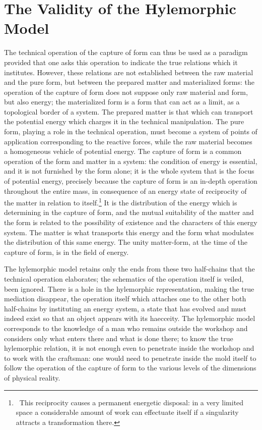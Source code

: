 \documentclass[a4paper]{article}
\begin{document}

\newpage
\section{The Validity of the Hylemorphic Model}

The technical operation of the capture of form can thus be used as a paradigm provided that one asks this operation to indicate the true relations which it institutes. However, these relations are not established between the raw material and the pure form, but between the prepared matter and materialized forms: the operation of the capture of form does not suppose only raw material and form, but also energy; the materialized form is a form that can act as a limit, as a topological border of a system. The prepared matter is that which can transport the potential energy which charges it in the technical manipulation. The pure form, playing a role in the technical operation, must become a system of points of application corresponding to the reactive forces, while the raw material becomes a homogeneous vehicle of potential energy. The capture of form is a common operation of the form and matter in a system: the condition of energy is essential, and it is not furnished by the form alone; it is the whole system that is the focus of potential energy, precisely because the capture of form is an in-depth operation throughout the entire mass, in consequence of an energy state of reciprocity of the matter in relation to itself.\footnote{\ This reciprocity causes a permanent energetic disposal: in a very limited space a considerable amount of work can effectuate itself if a singularity attracts a transformation there.} It is the distribution of the energy which is determining in the capture of form, and the mutual suitability of the matter and the form is related to the possibility of existence and the characters of this energy system. The matter is what transports this energy and the form what modulates the distribution of this same energy. The unity matter-form, at the time of the capture of form, is in the field of energy.

The hylemorphic model retains only the ends from these two half-chains that the technical operation elaborates; the schematics of the operation itself is veiled, been ignored. There is a hole in the hylemorphic representation, making the true mediation disappear, the operation itself which attaches one to the other both half-chains by instituting an energy system, a state that has evolved and must indeed exist so that an object appears with its haecceity. The hylemorphic model corresponds to the knowledge of a man who remains outside the workshop and considers only what enters there and what is done there; to know the true hylemorphic relation, it is not enough even to penetrate inside the workshop and to work with the craftsman: one would need to penetrate inside the mold itself to follow the operation of the capture of form to the various levels of the dimensions of physical reality.
\end{document}
